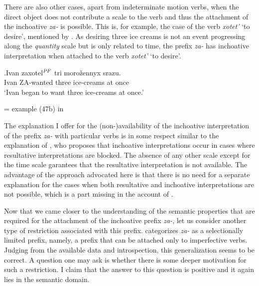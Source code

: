 There are also other cases, apart from indeterminate motion verbs, when the direct object does not contribute a scale to the verb and thus the attachment of the inchoative \textit{za-} is possible. This is, for example, the case of the verb \textit{xotet'} `to desire', mentioned by \citet{Braginsky:08}. As desiring three ice creams is not an event progressing along the \textit{quantity} scale but is only related to time, the prefix \textit{za-} has inchoative interpretation when attached to the verb \textit{xotet'} `to desire'.

\exg.\label{ex:zaxotet}Ivan zaxotel$^{\mathit{PF}}$ tri moro\v{z}ennyx srazu.\\
Ivan ZA-wanted three ice-creams {at once}\\
\vspace{0.5em}
`Ivan began to want three ice-creams at once.'
\begin{flushright}
\vspace{-0.5em}
= example (47b) in \citealt[254]{Braginsky:08}
\end{flushright}

The explanation I offer for the (non-)availability of the inchoative interpretation of the prefix \textit{za-} with particular verbs is in some respect similar to the explanation of \citet{Braginsky:08}, who proposes that inchoative interpretations occur in cases where resultative interpretations are blocked. The absence of any other scale except for the time scale garantees that the resultative interpretation is not available. The advantage of the approach advocated here is that there is no need for a separate explanation for the cases when both resultative and inchoative interpretations are not possible, which is a part missing in the account of \citet{Braginsky:08}.

Now that we came closer to the understanding of the semantic properties that are required for the attachment of the inchoative prefix \textit{za-}, let us consider another type of restriction associated with this prefix. \citet{Tatevosov:09} categorizes \textit{za-} as a selectionally limited prefix, namely, a prefix that can be attached only to imperfective verbs. Judging from the available data and introspection, this generalization seems to be correct. A question one may ask is whether there is some deeper motivation for such a restriction. I claim that the answer to this question is positive and it again lies in the semantic domain. 

